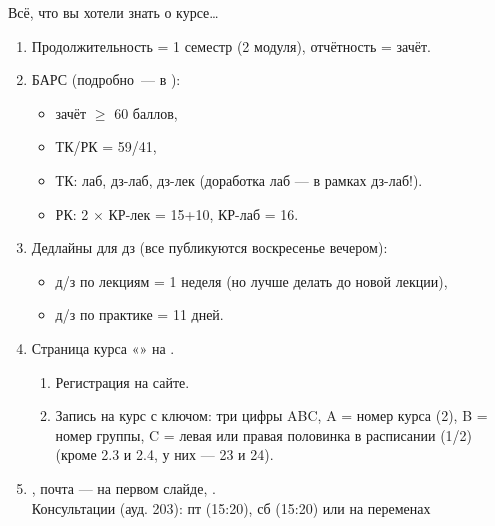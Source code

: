\begin{frame}{Всё, что вы хотели знать о курсе\ldots}
\begin{enumerate}
	\pause\item Продолжительность = 1 семестр (2 модуля), отчётность = зачёт.

	\pause\item БАРС (подробно~---
		в ):{\footnotesize
		\begin{itemize}
		\item зачёт ${\geqslant}$ 60 баллов,
		\item ТК/РК = 59/41,
		\item ТК: лаб, дз-лаб, дз-лек (доработка лаб — в рамках дз-лаб!).
		\item РК: 2 ${\times}$ КР-лек = 15+10, КР-лаб = 16.
		\end{itemize}}

	\pause\item Дедлайны для дз (все публикуются воскресенье вечером): {\footnotesize
		\begin{itemize}
		\item д/з по лекциям  = 1 неделя (но лучше делать до новой лекции),
		\item д/з по практике = 11 дней.
		\end{itemize}}

	\pause\item Страница курса «» на .{\footnotesize
		\begin{enumerate}
		\item Регистрация на сайте.
		\item Запись на курс с ключом: три цифры ABC, A =  номер курса (2), B = номер группы, C = левая или правая половинка в расписании (1/2) (кроме 2.3 и 2.4, у них — 23 и 24).
		\end{enumerate}}

	\pause\item {},
		почта — на первом слайде,
        .
		\\ \footnotesize{Консультации (ауд. 203): пт (15:20), сб (15:20) или на переменах}
\end{enumerate}
\end{frame}

